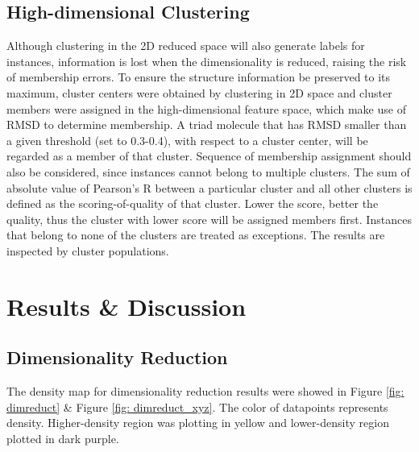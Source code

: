 \documentclass[a4paper]{article}
\begin{document}
\subsection{High-dimensional Clustering}
Although clustering in the 2D reduced space will also generate labels for instances, information is lost when the dimensionality is reduced, raising the risk of membership errors. To ensure the structure information be preserved to its maximum, cluster centers were obtained by clustering in 2D space and cluster members were assigned in the high-dimensional feature space, which make use of RMSD to determine membership. A triad molecule that has RMSD smaller than a given threshold (set to 0.3-0.4), with respect to a cluster center, will be regarded as a member of that cluster. Sequence of membership assignment should also be considered, since instances cannot belong to multiple clusters. The sum of absolute value of Pearson's R between a particular cluster and all other clusters is defined as the scoring-of-quality of that cluster. Lower the score, better the quality, thus the cluster with lower score will be assigned members first. Instances that belong to none of the clusters are treated as exceptions. The results are inspected by cluster populations. 

\section{Results \& Discussion}

\subsection{Dimensionality Reduction}
The density map for dimensionality reduction results were showed in Figure \ref{fig: dimreduct} \& Figure \ref{fig: dimreduct_xyz}. The color of datapoints represents density. Higher-density region was plotting in yellow and lower-density region plotted in dark purple.
\end{document}
